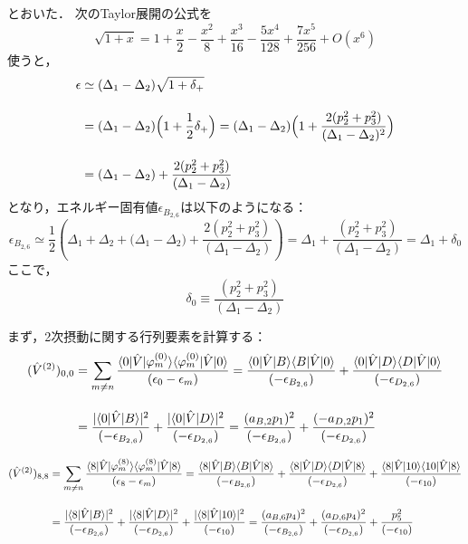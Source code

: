 とおいた．
次のTaylor展開の公式を
\begin{equation}
    \sqrt{1+x}
    =1+\frac{x}{2}-\frac{x^2}{8}+\frac{x^3}{16}-\frac{5x^4}{128}+\frac{7x^5}{256}+O\left(x^6\right)
\end{equation}
使うと，
\begin{align}
    \epsilon
    &\simeq{(\Delta_{1}}-{\Delta_{2}})
    \sqrt{1+\delta_{+}}\nn[10pt]
    &={(\Delta_{1}}-{\Delta_{2}})
    \Bigl(1+\frac{1}{2}\delta_{+}\Bigr)
    ={(\Delta_{1}}-{\Delta_{2}})
    \Bigl(1+\frac{2(p_2^2+p_3^2)}{(\Delta_{1}-\Delta_{2})^2}\Bigr)\nn[10pt]
    &={(\Delta_{1}}-{\Delta_{2}})
    +\frac{2(p_2^2+p_3^2)}{(\Delta_{1}-\Delta_{2})}
\end{align}
となり，エネルギー固有値$\epsilon_{B_{2,6}}$は以下のようになる：
\begin{equation}
    \epsilon_{B_{2,6}}
    \simeq\frac{1}{2}\left({\Delta_{1}}
    +{\Delta_{2}}+{(\Delta_{1}}-{\Delta_{2}})
    +\frac{2(p_2^2+p_3^2)}{(\Delta_{1}-\Delta_{2})}\right)
    =\Delta_1 + \frac{(p_2^2+p_3^2)}{(\Delta_{1}-\Delta_{2})}
    =\Delta_1 + \delta_0
\end{equation}
ここで，
\begin{equation}
    \delta_0 \equiv \frac{(p_2^2+p_3^2)}{(\Delta_{1}-\Delta_{2})}
\end{equation}

まず，2次摂動に関する行列要素を計算する：
\begin{align}
    (\hat{V}^{(2)})_{0,0}
    &=\sum_{m\neq n}
    \frac{\langle{0|\hat{V}|\varphi^{(0)}_m}\rangle
    \langle{\varphi^{(0)}_{m}|\hat{V}|0}\rangle}
    {(\epsilon_0-\epsilon_m)}
    =
    \frac{\langle{0|\hat{V}|B}\rangle
    \langle{B|\hat{V}|0}\rangle}
    {(-\epsilon_{B_{2,6}})}
    +\frac{\langle{0|\hat{V}|D}\rangle
    \langle{D|\hat{V}|0}\rangle}
    {(-\epsilon_{D_{2,6}})}\nn[10pt]
    &=\frac{|\langle{0|\hat{V}|B}\rangle|^2}
    {(-\epsilon_{B_{2,6}})}
    +\frac{|\langle{0|\hat{V}|D}\rangle|^2}
    {(-\epsilon_{D_{2,6}})}
    =\frac{(a_{B,2} p_1)^2}
    {(-\epsilon_{B_{2,6}})}
    +\frac{(-a_{D,2} p_1)^2}
    {(-\epsilon_{D_{2,6}})}
\end{align}


\begin{align}
    (\hat{V}^{(2)})_{8,8}
    &=\sum_{m\neq n}
    \frac{\langle{8|\hat{V}|\varphi^{(8)}_m}\rangle
    \langle{\varphi^{(8)}_{m}|\hat{V}|8}\rangle}
    {(\epsilon_8-\epsilon_m)}
    =
    \frac{\langle{8|\hat{V}|B}\rangle
    \langle{B|\hat{V}|8}\rangle}
    {(-\epsilon_{B_{2,6}})}
    +\frac{\langle{8|\hat{V}|D}\rangle
    \langle{D|\hat{V}|8}\rangle}
    {(-\epsilon_{D_{2,6}})}
    +\frac{\langle{8|\hat{V}|10}\rangle
    \langle{10|\hat{V}|8}\rangle}
    {(-\epsilon_{10})}
    \nn[10pt]
    &=\frac{|\langle{8|\hat{V}|B}\rangle|^2}
    {(-\epsilon_{B_{2,6}})}
    +\frac{|\langle{8|\hat{V}|D}\rangle|^2}
    {(-\epsilon_{D_{2,6}})}
    +\frac{|\langle{8|\hat{V}|10}\rangle|^2}
    {(-\epsilon_{10})}
    =\frac{(a_{B,6} p_4)^2}
    {(-\epsilon_{B_{2,6}})}
    +\frac{(a_{D,6} p_4)^2}
    {(-\epsilon_{D_{2,6}})}
    +\frac{p_5^2}
    {(-\epsilon_{10})}
\end{align}




